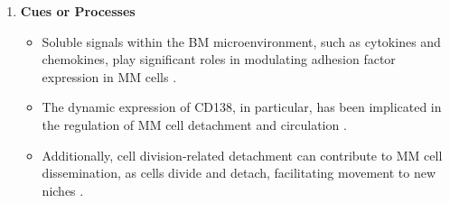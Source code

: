 \begin{enumerate}
    \item \textbf{Cues or Processes}
          \begin{itemize}
              \item Soluble signals within the BM microenvironment, such as
                    cytokines and chemokines, play significant roles in modulating
                    adhesion factor expression in MM cells
                    \cite{aggarwalChemokinesMultipleMyeloma2006, alsayedMechanismsRegulationCXCR42007}.
              \item The dynamic expression of CD138, in particular, has been
                    implicated in the regulation of MM cell detachment and circulation
                    \cite{akhmetzyanovaDynamicCD138Surface2020}.
              \item Additionally, cell division-related detachment can
                    contribute to MM cell dissemination, as cells divide and detach,
                    facilitating movement to new niches
                    \cite{dotterweichContactMyelomaCells2016, chatterjeePresenceBoneMarrow2002}.
          \end{itemize}
\end{enumerate}




